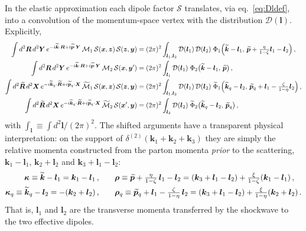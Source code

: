 \documentclass[11pt,a4paper]{article}
\newcommand{\calM}{\mathcal{M}}
\newcommand{\calD}{\mathcal{D}}
\newcommand{\calS}{\mathcal{S}}
\newcommand{\vx}{\bm{x}}
\newcommand{\vy}{\bm{y}}
\newcommand{\vz}{\bm{z}}
\newcommand{\vR}{\bm{R}}
\newcommand{\vY}{\bm{Y}}
\newcommand{\vX}{\bm{X}}
\newcommand{\vRt}{\widetilde{\bm{R}}}
\newcommand{\vk}{\bm{k}}
\newcommand{\vl}{\bm{l}}
\newcommand{\kt}{\widetilde{\bm{k}}}
\newcommand{\pt}{\widetilde{\bm{p}}}
\newcommand{\ktq}{\widetilde{\bm{k}}_{q}}
\newcommand{\ptq}{\widetilde{\bm{p}}_{q}}
\numberwithin{equation}{section}
\begin{document}
In the elastic approximation each dipole factor $\calS$ translates, via
eq.~\eqref{eq:Dldef}, into a convolution of the momentum-space vertex with the distribution
$\calD(\vl)$. Explicitly,
\begin{align}
\label{eq:convolutions}
\int d^{2}\vR\,d^{2}\vY\,e^{-i\kt\cdot \vR+i\pt\cdot \vY}\,\calM_{1}\,
\calS(\vx,\vz)\,\calS(\vz,\vy) & = (2\pi)^{2}\int_{\vl_{1},\vl_{2}}
\calD(\vl_{1})\,\calD(\vl_{2})\;\Phi_{1}\Big(\kt-\vl_{1},\,
\pt+\tfrac{\eta}{1-\zeta}\vl_{1}-\vl_{2}\Big)\,,\notag \\
\int d^{2}\vR\,d^{2}\vY\,e^{-i\kt\cdot \vR+i\pt\cdot \vY}\,\calM_{2}\,
\calS(\vx,\vy') & = (2\pi)^{2}\int_{\vl_{1}}\calD(\vl_{1})\;
\Phi_{2}\big(\kt-\vl_{1},\,\pt\big)\,,\notag \\
\int d^{2}\vRt\,d^{2}\vX\,e^{-i\ktq\cdot\vRt+i\ptq\cdot \vX}\,\widetilde{\calM}_{1}\,
\calS(\vx,\vz)\,\calS(\vz,\vy) & = (2\pi)^{2}\int_{\vl_{1},\vl_{2}}
\calD(\vl_{1})\,\calD(\vl_{2})\;\widetilde{\Phi}_{1}\Big(\ktq-\vl_{2},\,
\ptq+\vl_{1}-\tfrac{\zeta}{1-\eta}\vl_{2}\Big)\,,\notag \\
\int d^{2}\vRt\,d^{2}\vX\,e^{-i\ktq\cdot\vRt+i\ptq\cdot \vX}\,\widetilde{\calM}_{2}\,
\calS(\vx',\vy) & = (2\pi)^{2}\int_{\vl_{2}}\calD(\vl_{2})\;
\widetilde{\Phi}_{2}\big(\ktq-\vl_{2},\,\ptq\big)\,,
\end{align}
with $\int_{\vl}\equiv\int d^2\vl/(2\pi)^2$. The shifted arguments have a transparent
physical interpretation: on the support of $\delta^{(2)}(\vk_1+\vk_2+\vk_3)$ they are simply
the relative momenta constructed from the parton momenta \emph{prior} to the scattering,
$\vk_{1}-\vl_{1}$, $\vk_{2}+\vl_{2}$ and $\vk_{3}+\vl_{1}-\vl_{2}$:
\begin{align}
\label{eq:kapparho}
\bm\kappa \equiv \kt-\vl_{1} = \vk_{1}-\vl_{1}\,, &\qquad
\bm\rho \equiv \pt+\tfrac{\eta}{1-\zeta}\,\vl_{1}-\vl_{2}
= (\vk_{3}+\vl_{1}-\vl_{2})+\tfrac{\xi}{1-\zeta}(\vk_{1}-\vl_{1})\,,\notag \\
\bm\kappa_{q} \equiv \ktq-\vl_{2} = -(\vk_{2}+\vl_{2})\,, &\qquad
\bm\rho_{q} \equiv \ptq+\vl_{1}-\tfrac{\zeta}{1-\eta}\,\vl_{2}
= (\vk_{3}+\vl_{1}-\vl_{2})+\tfrac{\xi}{1-\eta}(\vk_{2}+\vl_{2})\,.
\end{align}
That is, $\vl_1$ and $\vl_2$ are the transverse momenta transferred by the shockwave to the
two effective dipoles.
\end{document}
